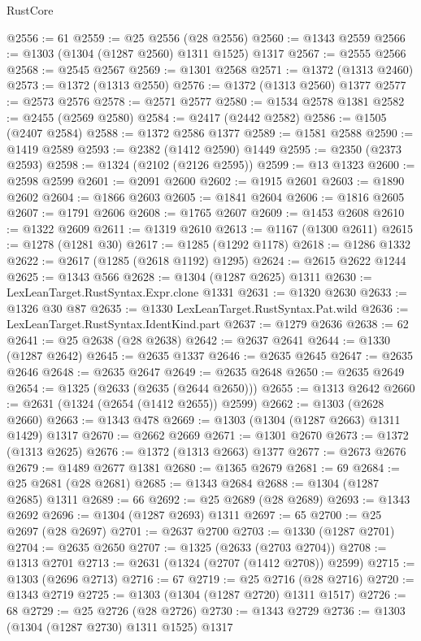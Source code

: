 \begin{lexlean}{RustCore}
\begin{coremodule}
@2556 := 61
@2559 := @25 @2556 (@28 @2556)
@2560 := @1343 @2559
@2566 := @1303 (@1304 (@1287 @2560) @1311 @1525) @1317
@2567 := @2555 @2566
@2568 := @2545 @2567
@2569 := @1301 @2568
@2571 := @1372 (@1313 @2460)
@2573 := @1372 (@1313 @2550)
@2576 := @1372 (@1313 @2560) @1377
@2577 := @2573 @2576
@2578 := @2571 @2577
@2580 := @1534 @2578 @1381
@2582 := @2455 (@2569 @2580)
@2584 := @2417 (@2442 @2582)
@2586 := @1505 (@2407 @2584)
@2588 := @1372 @2586 @1377
@2589 := @1581 @2588
@2590 := @1419 @2589
@2593 := @2382 (@1412 @2590) @1449
@2595 := @2350 (@2373 @2593)
@2598 := @1324 (@2102 (@2126 @2595))
@2599 := @13 @1323
@2600 := @2598 @2599
@2601 := @2091 @2600
@2602 := @1915 @2601
@2603 := @1890 @2602
@2604 := @1866 @2603
@2605 := @1841 @2604
@2606 := @1816 @2605
@2607 := @1791 @2606
@2608 := @1765 @2607
@2609 := @1453 @2608
@2610 := @1322 @2609
@2611 := @1319 @2610
@2613 := @1167 (@1300 @2611)
@2615 := @1278 (@1281 @30)
@2617 := @1285 (@1292 @1178)
@2618 := @1286 @1332
@2622 := @2617 (@1285 (@2618 @1192) @1295)
@2624 := @2615 @2622 @1244
@2625 := @1343 @566
@2628 := @1304 (@1287 @2625) @1311
@2630 := LexLeanTarget.RustSyntax.Expr.clone @1331
@2631 := @1320 @2630
@2633 := @1326 @30 @87
@2635 := @1330 LexLeanTarget.RustSyntax.Pat.wild
@2636 := LexLeanTarget.RustSyntax.IdentKind.part
@2637 := @1279 @2636
@2638 := 62
@2641 := @25 @2638 (@28 @2638)
@2642 := @2637 @2641
@2644 := @1330 (@1287 @2642)
@2645 := @2635 @1337
@2646 := @2635 @2645
@2647 := @2635 @2646
@2648 := @2635 @2647
@2649 := @2635 @2648
@2650 := @2635 @2649
@2654 := @1325 (@2633 (@2635 (@2644 @2650)))
@2655 := @1313 @2642
@2660 := @2631 (@1324 (@2654 (@1412 @2655)) @2599)
@2662 := @1303 (@2628 @2660)
@2663 := @1343 @478
@2669 := @1303 (@1304 (@1287 @2663) @1311 @1429) @1317
@2670 := @2662 @2669
@2671 := @1301 @2670
@2673 := @1372 (@1313 @2625)
@2676 := @1372 (@1313 @2663) @1377
@2677 := @2673 @2676
@2679 := @1489 @2677 @1381
@2680 := @1365 @2679
@2681 := 69
@2684 := @25 @2681 (@28 @2681)
@2685 := @1343 @2684
@2688 := @1304 (@1287 @2685) @1311
@2689 := 66
@2692 := @25 @2689 (@28 @2689)
@2693 := @1343 @2692
@2696 := @1304 (@1287 @2693) @1311
@2697 := 65
@2700 := @25 @2697 (@28 @2697)
@2701 := @2637 @2700
@2703 := @1330 (@1287 @2701)
@2704 := @2635 @2650
@2707 := @1325 (@2633 (@2703 @2704))
@2708 := @1313 @2701
@2713 := @2631 (@1324 (@2707 (@1412 @2708)) @2599)
@2715 := @1303 (@2696 @2713)
@2716 := 67
@2719 := @25 @2716 (@28 @2716)
@2720 := @1343 @2719
@2725 := @1303 (@1304 (@1287 @2720) @1311 @1517)
@2726 := 68
@2729 := @25 @2726 (@28 @2726)
@2730 := @1343 @2729
@2736 := @1303 (@1304 (@1287 @2730) @1311 @1525) @1317

\end{coremodule}
\end{lexlean}
